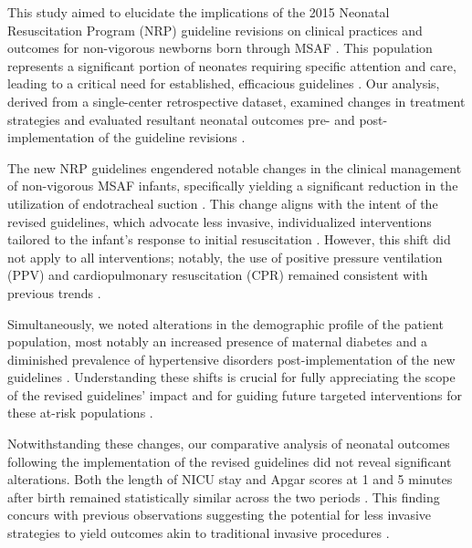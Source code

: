 \documentclass[11pt]{article}
\begin{document}
This study aimed to elucidate the implications of the 2015 Neonatal Resuscitation Program (NRP) guideline revisions on clinical practices and outcomes for non-vigorous newborns born through MSAF \cite{Polin2014SurfactantRT}. This population represents a significant portion of neonates requiring specific attention and care, leading to a critical need for established, efficacious guidelines \cite{Wiswell2000DeliveryRM}. Our analysis, derived from a single-center retrospective dataset, examined changes in treatment strategies and evaluated resultant neonatal outcomes pre- and post-implementation of the guideline revisions \cite{Blix2014DeviationsFS}.

The new NRP guidelines engendered notable changes in the clinical management of non-vigorous MSAF infants, specifically yielding a significant reduction in the utilization of endotracheal suction \cite{Bujold2006AntibioticTF, Hall2005MorphineHA}. This change aligns with the intent of the revised guidelines, which advocate less invasive, individualized interventions tailored to the infant's response to initial resuscitation \cite{Chu2014NeurologicalCA}. However, this shift did not apply to all interventions; notably, the use of positive pressure ventilation (PPV) and cardiopulmonary resuscitation (CPR) remained consistent with previous trends \cite{Durie2011EffectOS}.

Simultaneously, we noted alterations in the demographic profile of the patient population, most notably an increased presence of maternal diabetes and a diminished prevalence of hypertensive disorders post-implementation of the new guidelines \cite{Blix2019IntermittentAF}. Understanding these shifts is crucial for fully appreciating the scope of the revised guidelines' impact and for guiding future targeted interventions for these at-risk populations \cite{Zimmermann2020COVID19IC}.

Notwithstanding these changes, our comparative analysis of neonatal outcomes following the implementation of the revised guidelines did not reveal significant alterations. Both the length of NICU stay and Apgar scores at 1 and 5 minutes after birth remained statistically similar across the two periods \cite{Yadav2017StudyOR}. This finding concurs with previous observations suggesting the potential for less invasive strategies to yield outcomes akin to traditional invasive procedures \cite{Karaca2019LiveDL, Patel2013EarlyCT}.
\end{document}

